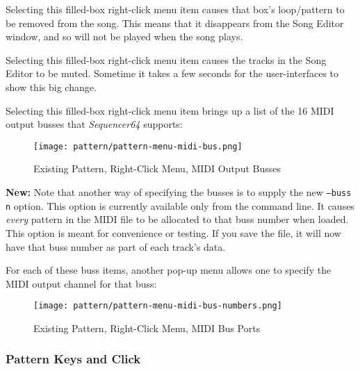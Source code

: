    \setcounter{ItemCounter}{0}      %

   Selecting this filled-box right-click menu item causes that box's
   loop/pattern to be removed from the song.  This means
   that it disappears from the Song Editor window, and so will not
   be played when the song plays.

   Selecting this filled-box right-click menu item causes
   the tracks in the Song Editor to be muted.  Sometime it takes a few seconds
   for the user-interfaces to show this big change.

   Selecting this filled-box right-click menu item brings up a list
   of the 16 MIDI output busses that \textsl{Sequencer64} supports:

\begin{figure}[H]
   \centering 
   \texttt{[image: pattern/pattern-menu-midi-bus.png]}
   \caption{Existing Pattern, Right-Click Menu, MIDI Output Busses}
   \label{fig:pattern_window_right_click_midi_bus}
\end{figure}

   \textbf{New:}
   Note that another way of specifying the busses is to supply the
   new \texttt{--buss n} option.  This option is currently available
   only from the command line.  It causes \textsl{every} pattern in the MIDI
   file to be allocated to that buss number when loaded.  This option is
   meant for convenience or testing.  If you save the file, it will now
   have that buss number as part of each track's data.

   For each of these buss items, another pop-up menu allows one
   to specify the MIDI output channel for that buss:

\begin{figure}[H]
   \centering 
   \texttt{[image: pattern/pattern-menu-midi-bus-numbers.png]}
   \caption{Existing Pattern, Right-Click Menu, MIDI Bus Ports}
   \label{fig:pattern_window_right_click_midi_bus_numbers}
\end{figure}

\subsubsection{Pattern Keys and Click}
\label{subsubsec:seq64_patterns_pattern_keys_and_clicks}

